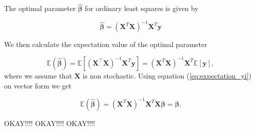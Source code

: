 The optimal parameter $\hat{\boldsymbol{\beta}}$ for ordinary least squares is given by

$$
\hat{\boldsymbol\beta}=(\mathbf{X}^T\mathbf{X})^{-1}\mathbf{X}^T\mathbf{y}
$$


We then calculate the expectation value of the optimal parameter

$$
\mathbb{E}(\boldsymbol{\hat{\beta}}) = \mathbb{E}[ (\mathbf{X}^{\top} \mathbf{X})^{-1}\mathbf{X}^{T} \mathbf{y}]=(\mathbf{X}^{T} \mathbf{X})^{-1}\mathbf{X}^{T} \mathbb{E}[ \mathbf{y}],
$$
where we assume that $\mathbf{X}$ is non stochastic. Using equation (\ref{eq:expectation_yi}) on vector form we get

\begin{equation}\label{eq:expectation_beta}
\mathbb{E}(\boldsymbol{\hat{\beta}}) = (\mathbf{X}^{T} \mathbf{X})^{-1} \mathbf{X}^{T}\mathbf{X}\boldsymbol{\beta}=\boldsymbol{\beta}.
\end{equation}



OKAY!!!! OKAY!!!! OKAY!!!!


